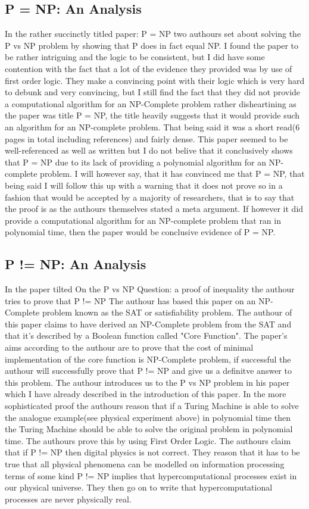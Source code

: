 \documentclass{report}
\begin{document}
\subsection{P = NP: An Analysis}
In the rather succinctly titled paper: P = NP\cite{PVsNPSolved} two authours set about solving the P vs NP problem by showing that P does in fact equal NP.  I found the paper to be rather intriguing and the logic to be consistent, but I did have some contention with the fact that a lot of the evidence they provided was by use of first order logic.  They make a convincing point with their logic which is very hard to debunk and very convincing, but I still find the fact that they did not provide a computational algorithm for an NP-Complete problem rather disheartining as the paper was title P = NP, the title heavily suggests that it would provide such an algorithm for an NP-complete problem.  That being said it was a short read(6 pages in total including references) and fairly dense.  This paper seemed to be well-referenced as well as written but I do not belive that it conclusively shows that P = NP due to its lack of providing a polynomial algorithm for an NP-complete problem.  I will however say, that it has convinced me that P = NP, that being said I will follow this up with a warning that it does not prove so in a fashion that would be accepted by a majority of researchers, that is to say that the proof is as the authours themselves stated a meta argument.  If however it did provide a computational algorithm for an NP-complete problem that ran in polynomial time, then the paper would be conclusive evidence of P = NP.
\subsection{P != NP: An Analysis}
In the paper tilted On the P vs NP Question: a proof of inequality the authour tries to prove that P != NP\cite{P!=NP} The authour has based this paper on an NP-Complete problem known as the SAT or satisfiability problem\cite{satisfiability}. The authour of this paper claims to have derived an NP-Complete problem from the SAT and that it's described by a Boolean function called "Core Function".  The paper's aims according to the authour are to prove that the cost of minimal implementation of the core function is NP-Complete problem, if successful the authour will successfully prove that P != NP and give us a definitve answer to this problem.  The authour introduces us to the P vs NP problem in his paper which I have already described in the introduction of this paper.
In the more sophisticated proof the authours reason that if a Turing Machine is able to solve the analogue example(see physical experiment above) in polynomial time then the Turing Machine should be able to solve the original problem in polynomial time.  The authours prove this by using First Order Logic\cite{Logic}.  The authours claim that if P != NP then digital physics\cite{Zuse} is not correct.  They reason that it has to be true that all physical phenomena can be modelled on information processing terms of some kind P != NP implies that hypercomputational processes\cite{} exist in our physical universe.  They then go on to write that hypercomputational processes are never physically real.
\end{document}
